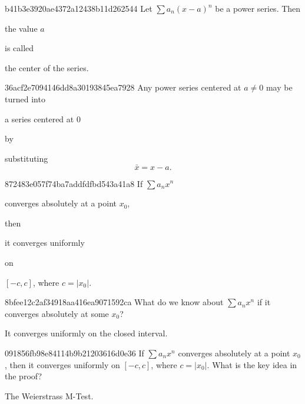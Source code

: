 \begin{note}{b41b3e3920ae4372a12438b11d262544}
    Let \({ \sum a_n (x - a)^{n} }\) be a power series.
    Then \begin{icloze}{2}the value \({ a }\)\end{icloze} is called \begin{icloze}{1}the center of the series.\end{icloze}
\end{note}

\begin{note}{36acf2e7094146dd8a30193845ea7928}
    Any power series centered at \({ a \neq 0 }\) may be turned into \begin{icloze}{2}a series centered at \({ 0 }\)\end{icloze} by
    \begin{icloze}{1}
        substituting
        \[
            \bar x = x - a.
        \]
    \end{icloze}
\end{note}

\begin{note}{872483e057f74ba7addfdfbd543a41a8}
    If \({ \sum a_n x^{n} }\) \begin{icloze}{2}converges absolutely at a point \({ x_0 }\),\end{icloze} then \begin{icloze}{1}it converges uniformly\end{icloze} on \begin{icloze}{3}\({ [-c, c] }\), where \({ c = \left\lvert x_0 \right\rvert }\).\end{icloze}
\end{note}

\begin{note}{8bfee12c2af34918aa416ea9071592ca}
    What do we know about \({ \sum a_n x^{n} }\) if it converges absolutely at some \({ x_0 }\)?

    \begin{cloze}{1}
        It converges uniformly on the closed interval.
    \end{cloze}
\end{note}

\begin{note}{091856fb98e84114b9b21203616d0e36}
    If \({ \sum a_n x^{n} }\) converges absolutely at a point \({ x_0 }\), then it converges uniformly on \({ [-c, c] }\), where \({ c = \left\lvert x_0 \right\rvert }\).
    What is the key idea in the proof?

    \begin{cloze}{1}
        The Weierstrass M-Test.
    \end{cloze}
\end{note}

